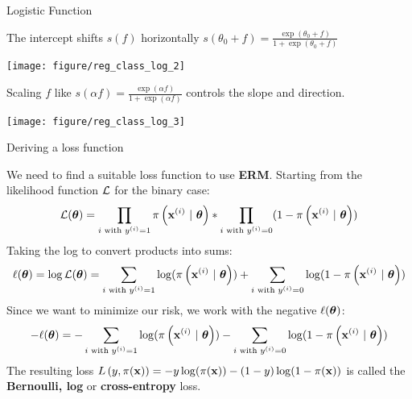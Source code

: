 \documentclass[11pt,compress,t,notes=noshow, xcolor=table]{beamer}
\begin{document}
\begin{vbframe}{Logistic Function}
  
The intercept shifts $s(f)$ horizontally $s(\theta_0 + f) = \frac{\exp(\theta_0 + f)}{1+\exp(\theta_0 + f)}$
\begin{knitrout}\scriptsize
{}\color{fgcolor}

{\centering \texttt{[image: figure/reg\_class\_log\_2]}  

}



\end{knitrout}

Scaling $f$ like $s(\alpha f) = \frac{\exp(\alpha f)}{1+\exp(\alpha f)}$ controls the slope and direction.
\lz
\begin{knitrout}\scriptsize
{}\color{fgcolor}

{\centering \texttt{[image: figure/reg\_class\_log\_3]} 

}



\end{knitrout}

\end{vbframe}

\begin{vbframe}{Deriving a loss function}

We need to find a suitable loss function to use \textbf{ERM}. Starting from the likelihood function $\mathcal{L}$ for the binary case:
$$
\mathcal{L}(\bm{\theta}) = \prod_{i \text{ with } y^{(i)} = 1} \pi\left(\mathbf{x}^{(i)} ~|~ \bm{\theta}\right) * \prod_{i \text{ with } y^{(i)} = 0} (1-\pi\left(\mathbf{x}^{(i)} ~|~ \bm{\theta}\right))
$$
Taking the log to convert products into sums:
$$
\ell(\bm{\theta}) = \log \mathcal{L}(\bm{\theta}) = \sum_{i \text{ with } y^{(i)} = 1} \log(\pi\left(\mathbf{x}^{(i)} ~|~ \bm{\theta}\right)) + \sum_{i \text{ with } y^{(i)} = 0} \log(1-\pi\left(\mathbf{x}^{(i)} ~|~ \bm{\theta}\right))
$$
Since we want to minimize our risk, we work with the negative $\ell(\bm{\theta})$:
$$
- \ell(\bm{\theta}) = - \sum_{i \text{ with } y^{(i)} = 1} \log(\pi\left(\mathbf{x}^{(i)} ~|~ \bm{\theta}\right)) - \sum_{i \text{ with } y^{(i)} = 0} \log(1-\pi\left(\mathbf{x}^{(i)} ~|~ \bm{\theta}\right))
$$
The resulting loss $L\left(y, \pi(\mathbf{x})\right) = -y\log(\pi(\mathbf{x}))-(1-y)\log(1-\pi(\mathbf{x}))$ is called the \textbf{Bernoulli, log} or \textbf{cross-entropy} loss.
\end{vbframe}
\end{document}
